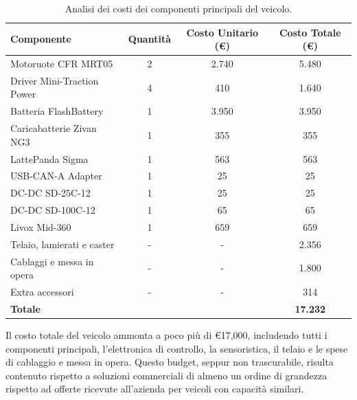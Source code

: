 \begin{table}[htbp]
    \centering
    \caption{Analisi dei costi dei componenti principali del veicolo.}
    \label{tab:analisi_costi}
    \begin{tabular}{|l|c|c|c|}
        \hline
        \textbf{Componente}        & \textbf{Quantità} & \textbf{Costo Unitario (€)} & \textbf{Costo Totale (€)} \\
        \hline
        Motoruote CFR MRT05        & 2                 & 2.740                       & 5.480                     \\
        Driver Mini-Traction Power & 4                 & 410                         & 1.640                     \\
        Batteria FlashBattery      & 1                 & 3.950                       & 3.950                     \\
        Caricabatterie Zivan NG3   & 1                 & 355                         & 355                       \\
        LattePanda Sigma           & 1                 & 563                         & 563                       \\
        USB-CAN-A Adapter          & 1                 & 25                          & 25                        \\
        DC-DC SD-25C-12            & 1                 & 25                          & 25                        \\
        DC-DC SD-100C-12           & 1                 & 65                          & 65                        \\
        Livox Mid-360              & 1                 & 659                         & 659                       \\
        Telaio, lamierati e caster & -                 & -                           & 2.356                     \\
        Cablaggi e messa in opera  & -                 & -                           & 1.800                     \\
        Extra accessori            & -                 & -                           & 314                       \\
        \hline
        \textbf{Totale}            &                   &                             & \textbf{17.232}           \\
        \hline
    \end{tabular}
\end{table}
Il costo totale del veicolo ammonta a poco più di €17,000, includendo tutti i componenti principali, l'elettronica di controllo, la sensoristica, il telaio e le spese di cablaggio e messa in opera. Questo budget, seppur non trascurabile, risulta contenuto rispetto a soluzioni commerciali di almeno un ordine di grandezza rispetto ad offerte ricevute all'azienda per veicoli con capacità similari.\\

